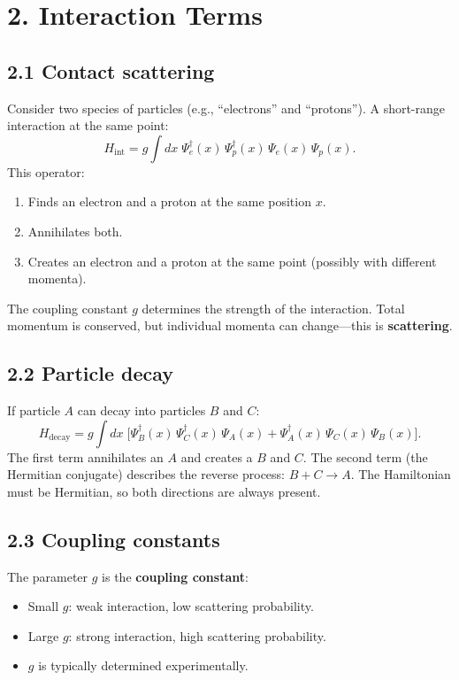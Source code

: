 \documentclass[12pt,a4paper]{article}
\begin{document}
\section{2. Interaction Terms}

\subsection{2.1 Contact scattering}

Consider two species of particles (e.g., ``electrons'' and ``protons'').  A short-range interaction at the same point:
\[
    H_{\text{int}} = g\int dx\;\Psi_e^\dagger(x)\,\Psi_p^\dagger(x)\,\Psi_e(x)\,\Psi_p(x).
\]
This operator:
\begin{enumerate}[nosep]
    \item Finds an electron and a proton at the same position $x$.
    \item Annihilates both.
    \item Creates an electron and a proton at the same point (possibly with different momenta).
\end{enumerate}
The coupling constant $g$ determines the strength of the interaction.  Total momentum is conserved, but individual momenta can change---this is \textbf{scattering}.

\subsection{2.2 Particle decay}

If particle $A$ can decay into particles $B$ and $C$:
\[
    H_{\text{decay}} = g\int dx\;\bigl[\Psi_B^\dagger(x)\,\Psi_C^\dagger(x)\,\Psi_A(x) + \Psi_A^\dagger(x)\,\Psi_C(x)\,\Psi_B(x)\bigr].
\]
The first term annihilates an $A$ and creates a $B$ and $C$.  The second term (the Hermitian conjugate) describes the reverse process: $B + C \to A$.  The Hamiltonian must be Hermitian, so both directions are always present.

\subsection{2.3 Coupling constants}

The parameter $g$ is the \textbf{coupling constant}:
\begin{itemize}[nosep]
    \item Small $g$: weak interaction, low scattering probability.
    \item Large $g$: strong interaction, high scattering probability.
    \item $g$ is typically determined experimentally.
\end{itemize}
\end{document}
